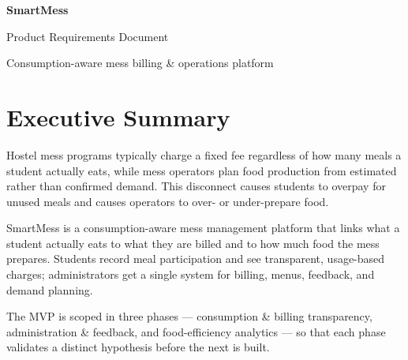 \documentclass[12pt,a4paper]{article}
\begin{document}

\begin{center}
    {\LARGE\bfseries SmartMess\par}
    \vspace{0.35em}
    {\large Product Requirements Document\par}
    \vspace{0.15em}
    {\normalsize Consumption-aware mess billing \& operations platform\par}

\end{center}

\vspace{0.8em}


\section*{Executive Summary}

Hostel mess programs typically charge a fixed fee regardless of how many meals a
student actually eats, while mess operators plan food production from estimated
rather than confirmed demand. This disconnect causes students to overpay for
unused meals and causes operators to over- or under-prepare food.

SmartMess is a consumption-aware mess management platform that links what a
student actually eats to what they are billed and to how much food the mess
prepares. Students record meal participation and see transparent, usage-based
charges; administrators get a single system for billing, menus, feedback, and
demand planning.

The MVP is scoped in three phases --- consumption \& billing transparency,
administration \& feedback, and food-efficiency analytics --- so that each phase
validates a distinct hypothesis before the next is built.

\end{document}
